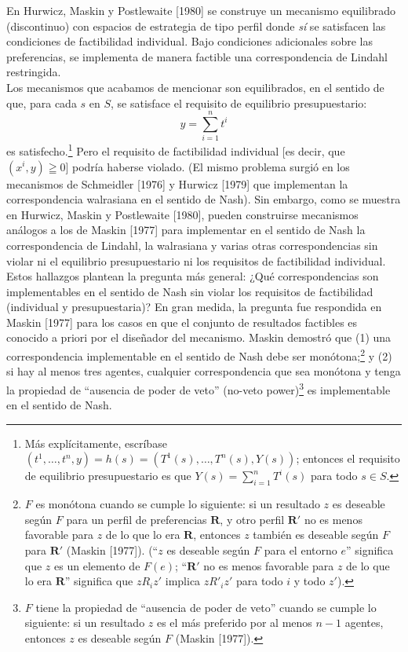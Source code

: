 \documentclass[12pt, letterpaper]{article}
\begin{document}
En Hurwicz, Maskin y Postlewaite [1980] se construye un mecanismo equilibrado (discontinuo) con espacios de estrategia de tipo perfil donde \textit{sí} se satisfacen las condiciones de factibilidad individual. Bajo condiciones adicionales sobre las preferencias, se implementa de manera factible una correspondencia de Lindahl restringida. \\

Los mecanismos que acabamos de mencionar son equilibrados, en el sentido de que, para cada $s$ en $S$, se satisface el requisito de equilibrio presupuestario:
\[
y = \sum_{i=1}^{n} t^{i}
\]
es satisfecho.\footnote{Más explícitamente, escríbase $(t^{1}, \dots, t^{n}, y) = h(s) = (T^{1}(s), \dots, T^{n}(s), Y(s))$; entonces el requisito de equilibrio presupuestario es que $Y(s) = \sum_{i=1}^{n} T^{i}(s)$ para todo $s \in S$.} Pero el requisito de factibilidad individual [es decir, que $(x^i, y) \geqq 0$] podría haberse violado. (El mismo problema surgió en los mecanismos de Schmeidler [1976] y Hurwicz [1979] que implementan la correspondencia walrasiana en el sentido de Nash). Sin embargo, como se muestra en Hurwicz, Maskin y Postlewaite [1980], pueden construirse mecanismos análogos a los de Maskin [1977] para implementar en el sentido de Nash la correspondencia de Lindahl, la walrasiana y varias otras correspondencias sin violar ni el equilibrio presupuestario ni los requisitos de factibilidad individual. \\

Estos hallazgos plantean la pregunta más general: ¿Qué correspondencias son implementables en el sentido de Nash sin violar los requisitos de factibilidad (individual y presupuestaria)? En gran medida, la pregunta fue respondida en Maskin [1977] para los casos en que el conjunto de resultados factibles es conocido a priori por el diseñador del mecanismo. Maskin demostró que (1) una correspondencia implementable en el sentido de Nash debe ser monótona;\footnote{$F$ es monótona cuando se cumple lo siguiente: si un resultado $z$ es deseable según $F$ para un perfil de preferencias $\mathbf{R}$, y otro perfil $\mathbf{R}'$ no es menos favorable para $z$ de lo que lo era $\mathbf{R}$, entonces $z$ también es deseable según $F$ para $\mathbf{R}'$ (Maskin [1977]). (``$z$ es deseable según $F$ para el entorno $e$'' significa que $z$ es un elemento de $F(e)$; ``$\mathbf{R}'$ no es menos favorable para $z$ de lo que lo era $\mathbf{R}$'' significa que $z R_i z'$ implica $z R'_i z'$ para todo $i$ y todo $z'$).} y (2) si hay al menos tres agentes, cualquier correspondencia que sea monótona y tenga la propiedad de ``ausencia de poder de veto'' (no-veto power)\footnote{$F$ tiene la propiedad de ``ausencia de poder de veto'' cuando se cumple lo siguiente: si un resultado $z$ es el más preferido por al menos $n - 1$ agentes, entonces $z$ es deseable según $F$ (Maskin [1977]).} es implementable en el sentido de Nash. \\
\end{document}
